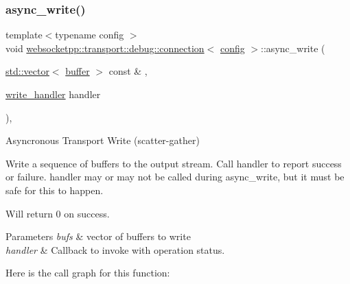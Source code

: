 \subsubsection{\texorpdfstring{async\+\_\+write()}{async\_write()}\hspace{0.1cm}{\footnotesize\ttfamily [2/2]}}
{\footnotesize\ttfamily template$<$typename config $>$ \\
void \mbox{\hyperlink{classwebsocketpp_1_1transport_1_1debug_1_1connection}{websocketpp\+::transport\+::debug\+::connection}}$<$ \mbox{\hyperlink{classconfig}{config}} $>$\+::async\+\_\+write (\begin{DoxyParamCaption}\item[{\mbox{\hyperlink{classstd_1_1vector}{std\+::vector}}$<$ \mbox{\hyperlink{structwebsocketpp_1_1transport_1_1buffer}{buffer}} $>$ const \&}]{,  }\item[{\mbox{\hyperlink{namespacewebsocketpp_1_1transport_addf5d728159e7aa2bce2a0df947b1560}{write\+\_\+handler}}}]{handler }\end{DoxyParamCaption})\hspace{0.3cm}{\ttfamily [inline]}, {\ttfamily [protected]}}



Asyncronous Transport Write (scatter-\/gather) 

Write a sequence of buffers to the output stream. Call handler to report success or failure. handler may or may not be called during async\+\_\+write, but it must be safe for this to happen.

Will return 0 on success.


\begin{DoxyParams}{Parameters}
{\em bufs} & vector of buffers to write \\
\hline
{\em handler} & Callback to invoke with operation status. \\
\hline
\end{DoxyParams}
Here is the call graph for this function\+:
\mbox{\label{classwebsocketpp_1_1transport_1_1debug_1_1connection_a1eb6d0259dfd111b99edc1edae4014f5}} 
